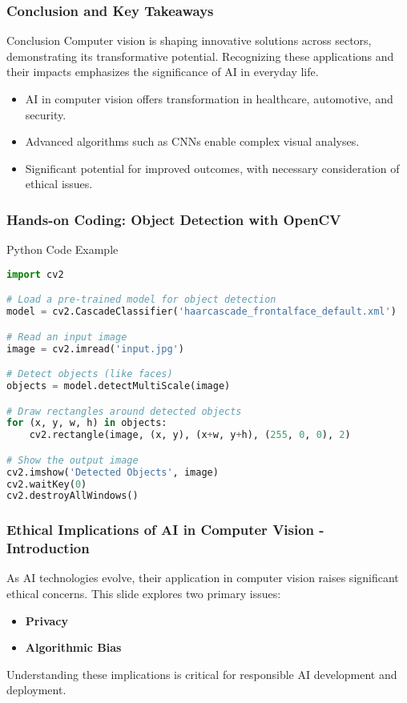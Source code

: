 \documentclass[aspectratio=169]{beamer}
\begin{document}
\begin{frame}[fragile]
  \frametitle{Conclusion and Key Takeaways}
  \begin{block}{Conclusion}
    Computer vision is shaping innovative solutions across sectors, demonstrating its transformative potential. Recognizing these applications and their impacts emphasizes the significance of AI in everyday life.
  \end{block}

  \begin{itemize}
    \item AI in computer vision offers transformation in healthcare, automotive, and security.
    \item Advanced algorithms such as CNNs enable complex visual analyses.
    \item Significant potential for improved outcomes, with necessary consideration of ethical issues.
  \end{itemize}
\end{frame}

\begin{frame}[fragile]
  \frametitle{Hands-on Coding: Object Detection with OpenCV}
  \begin{block}{Python Code Example}
    \begin{lstlisting}[language=Python]
import cv2

# Load a pre-trained model for object detection
model = cv2.CascadeClassifier('haarcascade_frontalface_default.xml')

# Read an input image
image = cv2.imread('input.jpg')

# Detect objects (like faces)
objects = model.detectMultiScale(image)

# Draw rectangles around detected objects
for (x, y, w, h) in objects:
    cv2.rectangle(image, (x, y), (x+w, y+h), (255, 0, 0), 2)

# Show the output image
cv2.imshow('Detected Objects', image)
cv2.waitKey(0)
cv2.destroyAllWindows()
    \end{lstlisting}
  \end{block}
\end{frame}

\begin{frame}[fragile]
    \frametitle{Ethical Implications of AI in Computer Vision - Introduction}
    As AI technologies evolve, their application in computer vision raises significant ethical concerns. This slide explores two primary issues: 
    \begin{itemize}
        \item \textbf{Privacy}
        \item \textbf{Algorithmic Bias}
    \end{itemize}
    Understanding these implications is critical for responsible AI development and deployment.
\end{frame}
\end{document}
